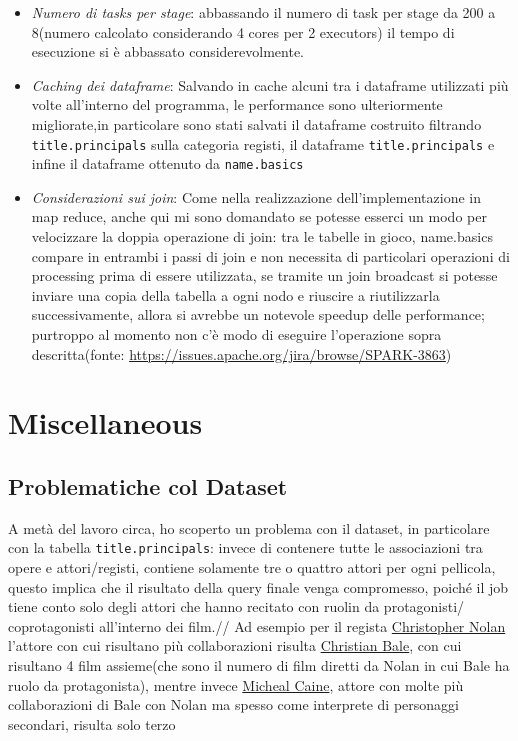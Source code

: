 \documentclass[hidelinks]{article}
\begin{document}
\begin{itemize}
	\begin{itemize}
		\item \textit{Numero di tasks per stage}: abbassando il numero di task per stage da 200 a 8(numero calcolato considerando 4 cores per 2 executors) il tempo di esecuzione si è abbassato considerevolmente.
		
			\item \textit{Caching dei dataframe}: Salvando in cache alcuni tra i dataframe utilizzati più volte all'interno del programma, le performance sono ulteriormente migliorate,in particolare sono stati salvati il dataframe costruito filtrando \texttt{title.principals} sulla categoria registi, il dataframe \texttt{title.principals} e infine il dataframe ottenuto da \texttt{name.basics}
			
			\item \textit{Considerazioni sui join}: Come nella realizzazione dell'implementazione in map reduce, anche qui mi sono domandato se potesse esserci un modo per velocizzare la doppia operazione di join: tra le tabelle in gioco, name.basics compare in entrambi i passi di join e non necessita di particolari operazioni di processing prima di essere utilizzata, se tramite un join broadcast si potesse inviare una copia della tabella a ogni nodo e riuscire a riutilizzarla successivamente, allora si avrebbe un notevole speedup delle performance; purtroppo al momento non c'è modo di eseguire l'operazione sopra descritta(fonte: \url{https://issues.apache.org/jira/browse/SPARK-3863})
	\end{itemize}
	
	
\end{itemize}


\section{Miscellaneous}

\subsection{Problematiche col Dataset}
A metà del lavoro circa, ho scoperto un problema con il dataset, in particolare con la tabella \texttt{title.principals}: invece di contenere tutte le associazioni tra opere e attori/registi, contiene solamente tre o quattro attori per ogni pellicola, questo implica che il risultato della query finale venga compromesso, poiché il job tiene conto solo degli attori che hanno recitato con ruolin da protagonisti/ coprotagonisti all'interno dei film.//
Ad esempio per il regista \href{https://www.imdb.com/name/nm0634240/}{Christopher Nolan} l'attore con cui risultano più collaborazioni risulta \href{https://www.imdb.com/name/nm0000288/}{Christian Bale}, con cui risultano 4 film assieme(che sono il numero di film diretti da Nolan in cui Bale ha ruolo da protagonista), mentre invece \href{https://www.imdb.com/name/nm0000323/}{Micheal Caine}, attore con molte più collaborazioni di Bale con Nolan ma spesso come interprete di personaggi secondari, risulta solo terzo
\end{document}
